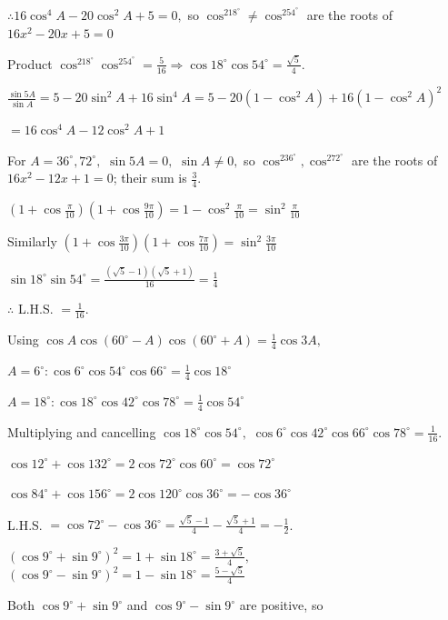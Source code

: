   $\therefore 16\cos^4A - 20\cos^2A + 5 = 0,$ so $\cos^218^\circ \neq \cos^254^\circ$ are the roots of $16x^2 - 20x + 5 = 0$

  Product $\cos^218^\circ\cos^254^\circ = \frac{5}{16} \Rightarrow \cos18^\circ\cos54^\circ = \frac{\sqrt{5}}{4}$.

\item $\frac{\sin5A}{\sin A} = 5 - 20\sin^2A + 16\sin^4A = 5 - 20(1 - \cos^2A) + 16(1 - \cos^2A)^2$

  $= 16\cos^4A - 12\cos^2A + 1$

  For $A = 36^\circ, 72^\circ,$ $\sin5A = 0,$ $\sin A \neq 0,$ so $\cos^236^\circ, \cos^272^\circ$ are the roots of $16x^2 -
  12x + 1 = 0$; their sum is $\frac{3}{4}$.

\item $\left(1 + \cos\frac{\pi}{10}\right)\left(1 + \cos\frac{9\pi}{10}\right) = 1 - \cos^2\frac{\pi}{10} =
  \sin^2\frac{\pi}{10}$

  Similarly $\left(1 + \cos\frac{3\pi}{10}\right)\left(1 + \cos\frac{7\pi}{10}\right) = \sin^2\frac{3\pi}{10}$

  $\sin18^\circ\sin54^\circ = \frac{(\sqrt{5} - 1)(\sqrt{5} + 1)}{16} = \frac{1}{4}$

  $\therefore$ L.H.S. $= \frac{1}{16}$.

\item Using $\cos A\cos(60^\circ - A)\cos(60^\circ + A) = \frac{1}{4}\cos3A,$

  $A = 6^\circ: \cos6^\circ\cos54^\circ\cos66^\circ = \frac{1}{4}\cos18^\circ$

  $A = 18^\circ: \cos18^\circ\cos42^\circ\cos78^\circ = \frac{1}{4}\cos54^\circ$

  Multiplying and cancelling $\cos18^\circ\cos54^\circ,$ $\cos6^\circ\cos42^\circ\cos66^\circ\cos78^\circ = \frac{1}{16}$.

\item $\cos12^\circ + \cos132^\circ = 2\cos72^\circ\cos60^\circ = \cos72^\circ$

  $\cos84^\circ + \cos156^\circ = 2\cos120^\circ\cos36^\circ = -\cos36^\circ$

  L.H.S. $= \cos72^\circ - \cos36^\circ = \frac{\sqrt{5} - 1}{4} - \frac{\sqrt{5} + 1}{4} = -\frac{1}{2}$.

\item $(\cos9^\circ + \sin9^\circ)^2 = 1 + \sin18^\circ = \frac{3 + \sqrt{5}}{4},$ $(\cos9^\circ - \sin9^\circ)^2 = 1 -
  \sin18^\circ = \frac{5 - \sqrt{5}}{4}$

  Both $\cos9^\circ + \sin9^\circ$ and $\cos9^\circ - \sin9^\circ$ are positive, so

